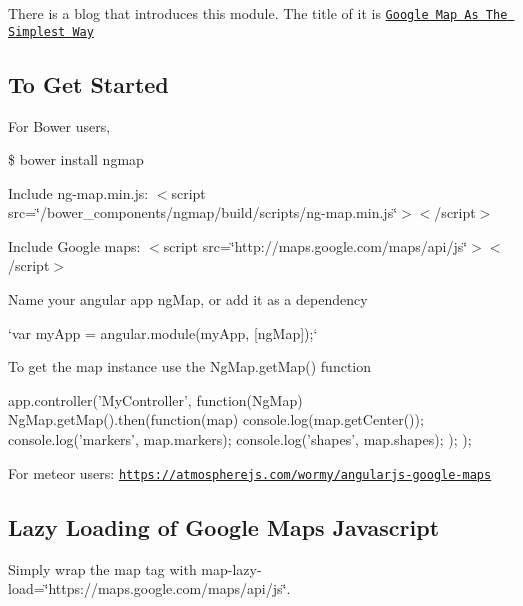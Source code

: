 There is a blog that introduces this module. The title of it is \textquotesingle{}\href{http://allenhwkim.tumblr.com/post/70986888283/google-map-as-the-simplest-way}{\tt Google Map As The Simplest Way}\textquotesingle{}

\subsection*{To Get Started }

For Bower users,

{\ttfamily \$ bower install ngmap}


\begin{DoxyEnumerate}
\item Include {\ttfamily ng-\/map.\+min.\+js}\+: {\ttfamily $<$script src=\char`\"{}/bower\+\_\+components/ngmap/build/scripts/ng-\/map.\+min.\+js\char`\"{}$>$$<$/script$>$}
\item Include Google maps\+: {\ttfamily $<$script src=\char`\"{}http\+://maps.\+google.\+com/maps/api/js\char`\"{}$>$$<$/script$>$}
\end{DoxyEnumerate}
\begin{DoxyEnumerate}
\item Name your angular app ng\+Map, or add it as a dependency

`var my\+App = angular.\+module(\textquotesingle{}my\+App\textquotesingle{}, \mbox{[}\textquotesingle{}ng\+Map\textquotesingle{}\mbox{]});`
\end{DoxyEnumerate}

To get the map instance use the {\ttfamily Ng\+Map.\+get\+Map()} function \begin{DoxyVerb}app.controller('MyController', function(NgMap) {
  NgMap.getMap().then(function(map) {
    console.log(map.getCenter());
    console.log('markers', map.markers);
    console.log('shapes', map.shapes);
  });
});
\end{DoxyVerb}


For meteor users\+: \href{https://atmospherejs.com/wormy/angularjs-google-maps}{\tt https\+://atmospherejs.\+com/wormy/angularjs-\/google-\/maps}

\subsection*{Lazy Loading of Google Maps Javascript }

Simply wrap the map tag with {\ttfamily map-\/lazy-\/load=\char`\"{}https\+://maps.\+google.\+com/maps/api/js\char`\"{}}.

